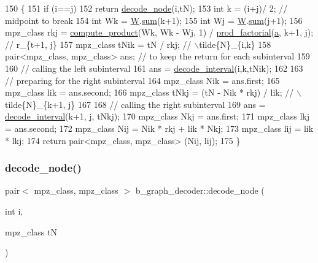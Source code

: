 \begin{DoxyCode}
150 \{
151   \textcolor{keywordflow}{if} (i==j)
152     \textcolor{keywordflow}{return} \hyperlink{classb__graph__decoder_a3d6d38da4436a92ebd01693cd3eb7c16}{decode\_node}(i,tN);
153   \textcolor{keywordtype}{int} k = (i+j)/ 2; \textcolor{comment}{// midpoint to break}
154   \textcolor{keywordtype}{int} Wk = \hyperlink{classb__graph__decoder_a2c3f91db1f54ddfd411f74d18b01b606}{W}.\hyperlink{classreverse__fenwick__tree_a672731fd6395b4853430073a099a80e6}{sum}(k+1);
155   \textcolor{keywordtype}{int} Wj = \hyperlink{classb__graph__decoder_a2c3f91db1f54ddfd411f74d18b01b606}{W}.\hyperlink{classreverse__fenwick__tree_a672731fd6395b4853430073a099a80e6}{sum}(j+1);
156   mpz\_class rkj = \hyperlink{compression__helper_8cpp_ac683dff9ff89796df0ab62cd65c30990}{compute\_product}(Wk, Wk - Wj, 1) / 
      \hyperlink{compression__helper_8cpp_a86d8a20e022dc06b23df3b08ac10b7d1}{prod\_factorial}(\hyperlink{classb__graph__decoder_afcf783e4199fb8f9d6828db08bb12333}{a}, k+1, j); \textcolor{comment}{// r\_\{t+1, j\}}
157   mpz\_class tNik = tN / rkj; \textcolor{comment}{// \(\backslash\)tilde\{N\}\_\{i,k\}}
158   pair<mpz\_class, mpz\_class> ans; \textcolor{comment}{// to keep the return for each subinterval}
159 
160   \textcolor{comment}{// calling the left subinterval }
161   ans = \hyperlink{classb__graph__decoder_ae8b20698e015819cbdb8da7997888fd8}{decode\_interval}(i,k,tNik);
162 
163   \textcolor{comment}{// preparing for the right subinterval}
164   mpz\_class Nik = ans.first;
165   mpz\_class lik = ans.second;
166   mpz\_class tNkj = (tN - Nik * rkj) / lik; \textcolor{comment}{// \(\backslash\)tilde\{N\}\_\{k+1, j\}}
167 
168   \textcolor{comment}{// calling the right subinterval}
169   ans = \hyperlink{classb__graph__decoder_ae8b20698e015819cbdb8da7997888fd8}{decode\_interval}(k+1, j, tNkj);
170   mpz\_class Nkj = ans.first;
171   mpz\_class lkj = ans.second;
172   mpz\_class Nij = Nik * rkj + lik * Nkj;
173   mpz\_class lij = lik * lkj;
174   \textcolor{keywordflow}{return} pair<mpz\_class, mpz\_class> (Nij, lij);
175 \}
\end{DoxyCode}
\mbox{\label{classb__graph__decoder_a3d6d38da4436a92ebd01693cd3eb7c16}} 
\subsubsection{\texorpdfstring{decode\+\_\+node()}{decode\_node()}}
{\footnotesize\ttfamily pair$<$ mpz\+\_\+class, mpz\+\_\+class $>$ b\+\_\+graph\+\_\+decoder\+::decode\+\_\+node (\begin{DoxyParamCaption}\item[{int}]{i,  }\item[{mpz\+\_\+class}]{tN }\end{DoxyParamCaption})}



